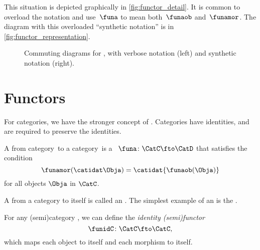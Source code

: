 This situation is depicted graphically in \cref{fig:functor_detail}.
%
It is common to overload the notation and use~$\funa$ to mean both~$\funaob$ and~$\funamor$.
The diagram with this overloaded ``synthetic notation'' is in \cref{fig:functor_representation}.

\vfill

\begin{figure*}[h!]
    \caption{
        Commuting diagrams for , with verbose notation (left) and synthetic notation (right).
    }
\end{figure*}

\vspace{2cm}


\section{Functors}
\label{sec:functors}

For categories, we have the stronger concept of .
Categories have identities, and  are required to preserve the identities.

\begin{ctdefinition}[Functor]
    \label{def:functor}
    A  from category~\CatC to a category~\CatD is a ~$\funa\colon \CatC \fto \CatD$
    that satisfies the condition
    \begin{equation}
        \label{eq:functor-condition}
        \funamor(\catidat\Obja)=\catidat{\funaob(\Obja)}
    \end{equation}
    for all objects $\Obja$ in $\CatC$. 
\end{ctdefinition}


A  from a category to itself is called an .
The simplest example of an  is the .

\begin{definition}\label{def:identity-semifunctor}
    For any (semi)category \CatC, we can define the \emph{identity (semi)functor}
    \begin{equation}
        \funidC \colon \CatC \fto \CatC,
    \end{equation}
    which maps each object to itself and each morphism to itself.
\end{definition}

